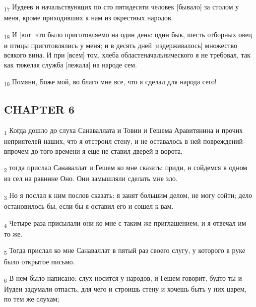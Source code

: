 \begin{tcolorbox}
\textsubscript{17} Иудеев и начальствующих по сто пятидесяти человек [бывало] за столом у меня, кроме приходивших к нам из окрестных народов.
\end{tcolorbox}
\begin{tcolorbox}
\textsubscript{18} И [вот] что было приготовляемо на один день: один бык, шесть отборных овец и птицы приготовлялись у меня; и в десять дней [издерживалось] множество всякого вина. И при [всем] том, хлеба областеначальнического я не требовал, так как тяжелая служба [лежала] на народе сем.
\end{tcolorbox}
\begin{tcolorbox}
\textsubscript{19} Помяни, Боже мой, во благо мне все, что я сделал для народа сего!
\end{tcolorbox}
\subsection{CHAPTER 6}
\begin{tcolorbox}
\textsubscript{1} Когда дошло до слуха Санаваллата и Товии и Гешема Аравитянина и прочих неприятелей наших, что я отстроил стену, и не оставалось в ней повреждений--впрочем до того времени я еще не ставил дверей в ворота, --
\end{tcolorbox}
\begin{tcolorbox}
\textsubscript{2} тогда прислал Санаваллат и Гешем ко мне сказать: приди, и сойдемся в одном из сел на равнине Оно. Они замышляли сделать мне зло.
\end{tcolorbox}
\begin{tcolorbox}
\textsubscript{3} Но я послал к ним послов сказать: я занят большим делом, не могу сойти; дело остановилось бы, если бы я оставил его и сошел к вам.
\end{tcolorbox}
\begin{tcolorbox}
\textsubscript{4} Четыре раза присылали они ко мне с таким же приглашением, и я отвечал им то же.
\end{tcolorbox}
\begin{tcolorbox}
\textsubscript{5} Тогда прислал ко мне Санаваллат в пятый раз своего слугу, у которого в руке было открытое письмо.
\end{tcolorbox}
\begin{tcolorbox}
\textsubscript{6} В нем было написано: слух носится у народов, и Гешем говорит, будто ты и Иудеи задумали отпасть, для чего и строишь стену и хочешь быть у них царем, по тем же слухам;
\end{tcolorbox}
